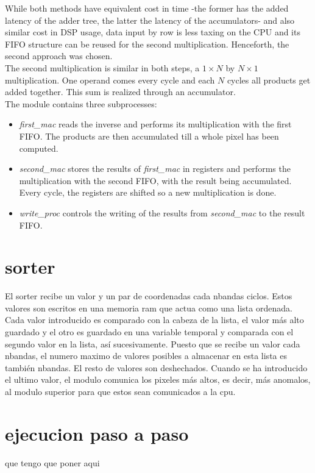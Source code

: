 While both methods have equivalent cost in time -the former has the added latency of the adder tree, the latter the latency of the accumulators- and also similar cost in DSP usage, data input by row is less taxing on the CPU and its FIFO structure can be reused for the second multiplication. Henceforth, the second approach was chosen.
\\

The second multiplication is similar in both steps, a \(1 \times N\) by \(N \times 1\) multiplication. One operand comes every cycle and each \(N\) cycles all products get added together. This sum is realized through an accumulator.\\

The module contains three subprocesses:
\begin{itemize}
	\item \emph{first\_mac} reads the inverse and performs its multiplication with the first FIFO. The products are then accumulated till a whole pixel has been computed.
	\item \emph{second\_mac} stores the results of \emph{first\_mac} in registers and performs the multiplication with the second FIFO, with the result being accumulated. Every cycle, the registers are shifted so a new multiplication is done.
	\item \emph{write\_proc} controls the writing of the results from \emph{second\_mac} to the result FIFO.
\end{itemize}



\section{sorter}
 El sorter recibe un valor y un par de coordenadas cada nbandas ciclos. Estos valores son escritos en una memoria ram que actua como una lista ordenada. Cada valor introducido es comparado con la cabeza de la lista, el valor más alto guardado y el otro es guardado en una variable temporal y comparada con el segundo valor en la lista, así sucesivamente. Puesto que se recibe un valor cada nbandas, el numero maximo de valores posibles a almacenar en esta lista es también nbandas. El resto de valores son deshechados. Cuando se ha introducido el ultimo valor, el modulo comunica los pixeles más altos, es decir, más anomalos, al modulo superior para que estos sean comunicados a la cpu.
\section{ejecucion paso a paso}
que tengo que poner aqui

